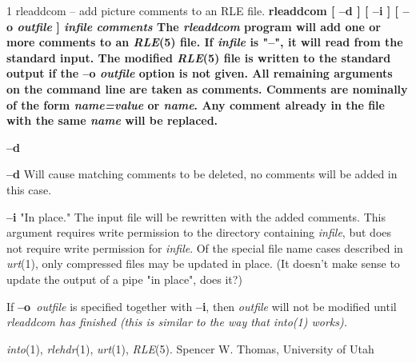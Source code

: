 %
%
%
 1
rleaddcom -- add picture comments to an RLE file.
\bf
rleaddcom 
[
{\bf --d}
] [
{\bf --i}
] [
{\bf --o}
{\it outfile}
] 
{\it infile}
{\it comments}
The 
{\it rleaddcom}
program will add one or more comments to an 
{\it RLE}{\rm (5)}
file.  If
{\it infile}
is "--", it will read from the standard input.  The modified 
{\it RLE}{\rm (5)}
file is written to the standard output if the
{\bf --o}
{\it outfile}
option is not given.  All remaining arguments on
the command line are taken as comments.  Comments are nominally of the
form
{\it name=value}
or
{\it name}{\rm .}
Any comment already in the file with the same
{\it name}
will be replaced.
\begin{TPlist}{{\bf --d}}
\item[{{\bf --d}}]
Will cause matching comments to be deleted, no comments will be added
in this case.
\item[{{\bf --i}}]
"In place."  The input file will be rewritten with the added comments.
This argument requires write permission to the directory containing
{\it infile}{\rm ,}
but does not require write permission for
{\it infile}{\rm .}
Of the special file name cases described in 
{\it urt}{\rm (1),}
only compressed files may be updated in place.  (It doesn't make sense
to update the output of a pipe "in place", does it?)

If
{\bf --o}{\it \ outfile}
is specified together with 
{\bf --i}{\rm ,}
then 
{\it outfile}
will not be modified until %
\it rleaddcom \rm%
has finished (this is
similar to the way that
{\it into}{\rm (1)}
works).
\end{TPlist}
{\it into}{\rm (1),}
{\it rlehdr}{\rm (1),}
{\it urt}{\rm (1),}
{\it RLE}{\rm (5).}
Spencer W. Thomas, University of Utah
\newpage


